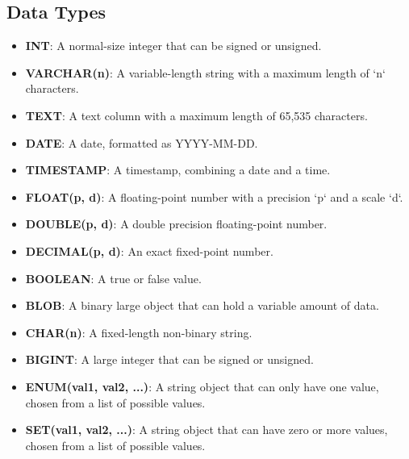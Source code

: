 \vspace{-0.3cm}
\subsection*{Data Types}
\vspace{-0.1cm}

\begin{itemize}[noitemsep,leftmargin=*]
\leftskip-\dimexpr\leftmargin %
    \item[]{\textbf{INT}: A normal-size integer that can be signed or unsigned.}
    \item[]{\textbf{VARCHAR(n)}: A variable-length string with a maximum length of `n` characters.}
    \item[]{\textbf{TEXT}: A text column with a maximum length of 65,535 characters.}
    \item[]{\textbf{DATE}: A date, formatted as YYYY-MM-DD.}
    \item[]{\textbf{TIMESTAMP}: A timestamp, combining a date and a time.}
    \item[]{\textbf{FLOAT(p, d)}: A floating-point number with a precision `p` and a scale `d`.}
    \item[]{\textbf{DOUBLE(p, d)}: A double precision floating-point number.}
    \item[]{\textbf{DECIMAL(p, d)}: An exact fixed-point number.}
    \item[]{\textbf{BOOLEAN}: A true or false value.}
    \item[]{\textbf{BLOB}: A binary large object that can hold a variable amount of data.}
    \item[]{\textbf{CHAR(n)}: A fixed-length non-binary string.}
    \item[]{\textbf{BIGINT}: A large integer that can be signed or unsigned.}
    \item[]{\textbf{ENUM(val1, val2, ...)}: A string object that can only have one value, chosen from a list of possible values.}
    \item[]{\textbf{SET(val1, val2, ...)}: A string object that can have zero or more values, chosen from a list of possible values.}
\end{itemize}